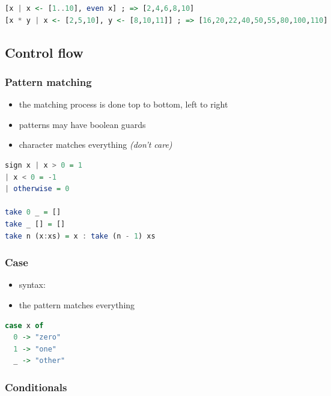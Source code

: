 \documentclass[a4paper,landscape,10pt]{article}
\begin{document}
\begin{multicols*}{2}
  \begin{lstlisting}[language=Haskell]
[x | x <- [1..10], even x] ; => [2,4,6,8,10]
[x * y | x <- [2,5,10], y <- [8,10,11]] ; => [16,20,22,40,50,55,80,100,110]
\end{lstlisting}

  \subsection{Control flow}

  \subsubsection{Pattern matching}

  \begin{itemize}
    \item the matching process is done top to bottom, left to right
    \item patterns may have boolean guards
    \item character \ihaskell{_} matches everything \textit{(don't care)}
  \end{itemize}

  \begin{lstlisting}[language=Haskell]
sign x | x > 0 = 1
| x < 0 = -1
| otherwise = 0

take 0 _ = []
take _ [] = []
take n (x:xs) = x : take (n - 1) xs
\end{lstlisting}

  \breakcolumn

  \subsubsection{Case}

  \begin{itemize}
    \item syntax: 
    \item the \ihaskell{_} pattern matches everything
  \end{itemize}

  \begin{lstlisting}[language=Haskell]
case x of
  0 -> "zero"
  1 -> "one"
  _ -> "other"
\end{lstlisting}

  \subsubsection{Conditionals}


\end{multicols*}
\end{document}
